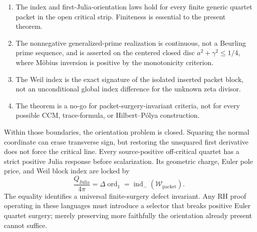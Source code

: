 \documentclass[11pt]{article}
\newcommand{\WW}{\mathcal W}
\newcommand{\ord}{\operatorname{ord}}
\newcommand{\indm}{\operatorname{ind}_{-}}
\begin{document}
\begin{enumerate}
\item The index and first-Julia-orientation laws hold for every finite
      generic quartet packet in the open critical strip.  Finiteness is
      essential to the present theorem.
\item The nonnegative generalized-prime realization is continuous, not a
      Beurling prime sequence, and is asserted on the centered closed disc
      \(a^2+\gamma^2\leq1/4\), where M\"obius inversion is positive by the
      monotonicity criterion.
\item The Weil index is the exact signature of the isolated inserted
      packet block, not an unconditional global index difference for the
      unknown zeta divisor.
\item The theorem is a no-go for packet-surgery-invariant criteria, not
      for every possible CCM, trace-formula, or Hilbert--P\'olya
      construction.
\end{enumerate}

Within those boundaries, the orientation problem is closed.  Squaring the
normal coordinate can erase transverse sign, but restoring the unsquared
first derivative does not force the critical line.  Every source-positive
off-critical quartet has a strict positive Julia response before
scalarization.  Its geometric charge, Euler pole price, and Weil block
index are locked by
\[
 \frac{Q_{\mathrm{Julia}}}{4\pi}
 =\Delta\ord_1
 =\indm(\WW_{\mathrm{packet}}).
\]
The equality identifies a universal finite-surgery defect invariant.
Any RH proof operating in these languages must introduce a selector that
breaks positive Euler quartet surgery; merely preserving more faithfully
the orientation already present cannot suffice.
\end{document}
